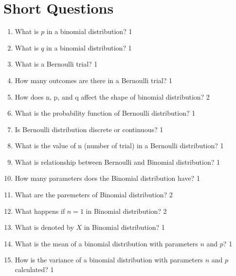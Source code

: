 \documentclass[a4paper,oneside, margin=1.4in]{book}
\begin{document}
\section{Short Questions}

 \begin{enumerate}
 
 \item What is $p$ in a binomial distribution? \hfill 1
 
 \item What is $q$ in a binomial distribution? \hfill 1
 
 \item What is a Bernoulli trial?  \hfill 1
 
 \item How many outcomes are there in a Bernoulli trial?  \hfill 1
 
 \item How does n, p, and q affect the shape of binomial distribution? \hfill 2
 
 \item What is the probability function of Bernoulli distribution? \hfill 1
 
 \item Is Bernoulli distribution discrete or continuous? \hfill 1
 
 \item What is the value of n (number of trial) in a Bernoulli distribution? \hfill 1
 
 \item What is relationship between Bernoulli and Binomial distribution? \hfill 1
 
 \item How many parameters does the Binomial distribution have? \hfill 1
  
  \item What are the paremeters of Binomial distribution? \hfill 2
  
  \item What happens if $n=1$ in Binomial distribution? \hfill 2
  
  \item What is denoted by $X$ in Binomial distribution? \hfill 1
  
 \item What is the mean of a binomial distribution with parameters \( n \) and \( p \)? \hfill 1

\item How is the variance of a binomial distribution with parameters \( n \) and \( p \) calculated? \hfill 1


\end{enumerate}
\end{document}
